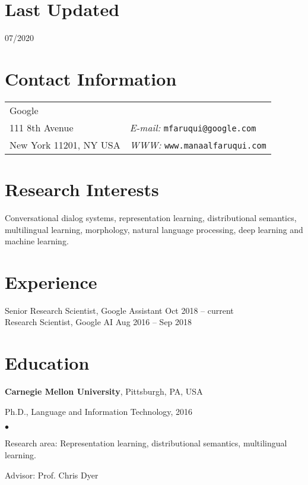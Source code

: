 \documentclass[margin,line]{res}
\newenvironment{list1}{
  \begin{list}{\ding{113}}{%
      \setlength{\itemsep}{0in}
      \setlength{\parsep}{0in} \setlength{\parskip}{0in}
      \setlength{\topsep}{0in} \setlength{\partopsep}{0in}
      \setlength{\leftmargin}{0.17in}}}{\end{list}}
\newenvironment{list2}{
  \begin{list}{$\bullet$}{%
      \setlength{\itemsep}{0in}
      \setlength{\parsep}{0in} \setlength{\parskip}{0in}
      \setlength{\topsep}{0in} \setlength{\partopsep}{0in}
      \setlength{\leftmargin}{0.2in}}}{\end{list}}
\begin{document}

\begin{resume}

\section{\sc Last Updated}

07/2020

\section{\sc Contact Information}
\vspace{.05in}
\begin{tabular}{@{}p{2in}p{4in}}
Google & \\
111 8th Avenue & {\it E-mail:}  \tt{mfaruqui@google.com}\\
New York 11201, NY USA &  {\it WWW:}  \tt{www.manaalfaruqui.com}\\
\end{tabular}

\section{\sc Research Interests}

Conversational dialog systems, representation learning,
distributional semantics, multilingual learning,
morphology, natural language processing, deep learning and machine learning.

\section{\sc Experience}
Senior Research Scientist, Google Assistant \hfill {Oct 2018 -- current}\\
Research Scientist, Google AI \hfill {Aug 2016 -- Sep 2018}

\section{\sc Education}
{\bf Carnegie Mellon University}, Pittsburgh, PA, USA\\
\vspace*{-.1in}
\begin{list1}
\item[] Ph.D., Language and Information Technology, 2016
\begin{list2}
\vspace*{.05in}
\item Research area: Representation learning, distributional semantics, multilingual learning.
\item Advisor:  Prof. Chris Dyer
\end{list2}
\end{list1}


\end{resume}
\end{document}
